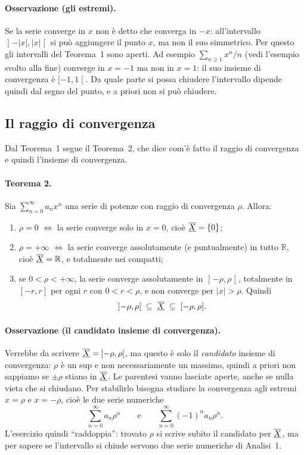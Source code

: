 \paragraph{Osservazione (gli estremi).}
Se la serie converge in $x$ non è detto che converga in $-x$: all'intervallo
$\mathopen{]}-|x|,|x|\mathclose{[}$ si può aggiungere il punto $x$, ma non il
suo simmetrico. Per questo gli intervalli del Teorema~1 sono aperti. Ad esempio
$\sum_{n\ge1}x^n/n$ (vedi l'esempio svolto alla fine) converge in $x=-1$ ma non
in $x=1$: il suo insieme di convergenza è $[-1,1\mathclose{[}$.
Da quale parte si possa chiudere l'intervallo dipende quindi dal segno del
punto, e a priori non si può chiudere.

\subsection{Il raggio di convergenza}

Dal Teorema~1 segue il Teorema~2, che dice com'è fatto il raggio di convergenza
e quindi l'insieme di convergenza.

\paragraph{Teorema 2.} Sia $\sum_{n=0}^{\infty}a_nx^n$ una serie di potenze con
raggio di convergenza $\rho$. Allora:
\begin{enumerate}
  \item $\rho=0$ $\Longleftrightarrow$ la serie converge solo in $x=0$, cioè
  $\overline{\underline{X}}=\{0\}$;
  \item $\rho=+\infty$ $\Longleftrightarrow$ la serie converge assolutamente (e
  puntualmente) in tutto $\mathbb{R}$, cioè $\overline{\underline{X}}=\mathbb{R}$, e totalmente nei
  compatti;
  \item se $0<\rho<+\infty$, la serie converge assolutamente in
  $\mathopen{]}-\rho,\rho\mathclose{[}$, totalmente in $[-r,r]$ per ogni $r$
  con $0<r<\rho$, e non converge per $|x|>\rho$. Quindi
  \[
    \mathopen{]}-\rho,\rho\mathclose{[}\;\subseteq\; \overline{\underline{X}}\;\subseteq\;[-\rho,\rho] .
  \]
\end{enumerate}

\paragraph{Osservazione (il candidato insieme di convergenza).}
Verrebbe da scrivere $\overline{\underline{X}}=\mathopen{]}-\rho,\rho\mathclose{[}$, ma questo è solo
il \emph{candidato} insieme di convergenza: $\rho$ è un sup e non
necessariamente un massimo, quindi a priori non sappiamo se $\pm\rho$ stiano in
$\overline{\underline{X}}$. Le parentesi vanno lasciate aperte, anche se nulla vieta che si chiudano.
Per stabilirlo bisogna studiare la convergenza agli estremi $x=\rho$ e
$x=-\rho$, cioè le due serie numeriche
\[
  \sum_{n=0}^{\infty}a_n\rho^n \qquad\text{e}\qquad \sum_{n=0}^{\infty}(-1)^n a_n\rho^n .
\]
L'esercizio quindi ``raddoppia'': trovato $\rho$ si scrive subito il candidato
per $\overline{\underline{X}}$, ma per sapere se l'intervallo si chiude servono due serie numeriche di
Analisi~1.

